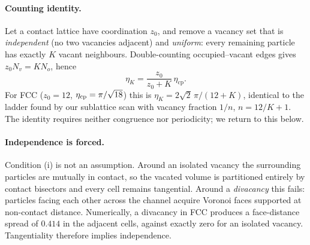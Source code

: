 \documentclass[aps,prl,twocolumn,superscriptaddress,floatfix]{revtex4-2}
\begin{document}
\paragraph{Counting identity.} Let a contact lattice have coordination $z_0$,
and remove a vacancy set that is \emph{independent} (no two vacancies adjacent)
and \emph{uniform}: every remaining particle has exactly $K$ vacant neighbours.
Double-counting occupied--vacant edges gives $z_0 N_v = K N_o$, hence
\begin{equation}
\eta_K=\frac{z_0}{z_0+K}\,\eta_{\mathrm{cp}} .
\label{eq:counting}
\end{equation}
For FCC ($z_0=12$, $\eta_{\rm cp}=\pi/\sqrt{18}$) this is
$\eta_K = 2\sqrt2\,\pi/(12+K)$, identical to the ladder found by our
sublattice scan with vacancy fraction $1/n$, $n=12/K+1$. The identity requires
neither congruence nor periodicity; we return to this below.

\paragraph{Independence is forced.} Condition (i) is not an assumption.
Around an isolated vacancy the surrounding particles are mutually in contact,
so the vacated volume is partitioned entirely by contact bisectors and every
cell remains tangential. Around a \emph{divacancy} this fails: particles facing
each other across the channel acquire Voronoi faces supported at non-contact
distance. Numerically, a divacancy in FCC produces a face-distance spread of
$0.414$ in the adjacent cells, against exactly zero for an isolated vacancy.
Tangentiality therefore implies independence.
\end{document}
